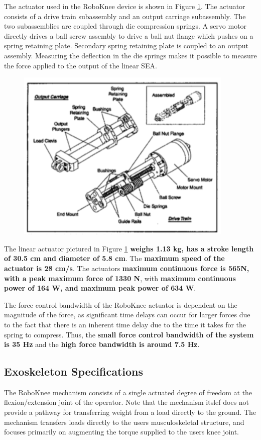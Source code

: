The actuator used in the RoboKnee device is shown in Figure \ref{fig:roboAct}.  The actuator consists of a drive train subassembly and an output carriage subassembly. The two subassemblies are coupled through die compression springs.  A servo motor directly drives a ball screw assembly to drive a ball nut flange which pushes on a spring retaining plate.  Secondary spring retaining plate is coupled to an output assembly.  Measuring the deflection in the die springs makes it possible to measure the force applied to the output of the linear SEA.  
\begin{figure}[thpb]
\centering
\includegraphics[width=3.in]{exos/figs/roboKnee/roboSEA}
  \caption{}
  \vspace{-0.2in}
 \label{fig:roboAct}   
 \end{figure}

The linear actuator pictured in Figure \ref{fig:roboAct} { \bf weighs 1.13 kg, has a stroke length of 30.5 cm and diameter of 5.8 cm}.  The {\bf maximum speed of the actuator is 28 cm/s}.  The actuators {\bf maximum continuous force is 565N, with a peak maximum force of 1330 N}, with {\bf maximum continuous power of 164 W, and maximum peak power of 634 W}.   

The force control bandwidth of the RoboKnee actuator is dependent on the magnitude of the force, as significant time delays can occur for larger forces due to the fact that there is an inherent time delay due to the time it takes for the spring to compress.  Thus, the {\bf small force control bandwidth of the system is 35 Hz} and the {\bf high force bandwidth is around 7.5 Hz}. 
 
 \subsection{Exoskeleton Specifications}
 
 The RoboKnee mechanism consists of a single actuated degree of freedom at the flexion/extension joint of the operator.  Note that the mechanism itslef does not provide a pathway for transferring weight from a load directly to the ground.  The mechanism transfers loads directly to the users musculoskeletal structure, and focuses primarily on augmenting the torque supplied to the users knee joint.
 
